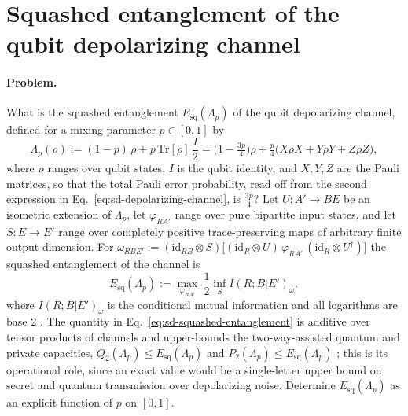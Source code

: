 \section{Squashed entanglement of the qubit depolarizing channel}
\label{sec:op_291a943fdec5bd1d}

\paragraph{Problem.}
What is the squashed entanglement $E_{\mathrm{sq}}(\Lambda_p)$ of the qubit
depolarizing channel, defined for a mixing parameter $p\in[0,1]$ by
\begin{equation}
  \Lambda_p(\rho):=(1-p)\,\rho+p\,\mathrm{Tr}[\rho]\,\frac{I}{2}
  =\bigl(1-\tfrac{3p}{4}\bigr)\rho
  +\tfrac{p}{4}\bigl(X\rho X+Y\rho Y+Z\rho Z\bigr),
  \label{eq:sd-depolarizing-channel}
\end{equation}
where $\rho$ ranges over qubit states, $I$ is the qubit identity, and
$X,Y,Z$ are the Pauli matrices, so that the total Pauli error probability,
read off from the second expression in Eq.~\eqref{eq:sd-depolarizing-channel},
is $\tfrac{3p}{4}$?  Let $U:A'\to BE$ be an isometric extension of
$\Lambda_p$, let $\varphi_{RA'}$ range over pure bipartite input states, and
let $S:E\to E'$ range over completely positive trace-preserving maps of
arbitrary finite output dimension.  For
$\omega_{RBE'}:=(\mathrm{id}_{RB}\otimes S)\bigl[(\mathrm{id}_R\otimes
U)\,\varphi_{RA'}\,(\mathrm{id}_R\otimes U^\dagger)\bigr]$ the squashed
entanglement of the channel is
\begin{equation}
  E_{\mathrm{sq}}(\Lambda_p)
  :=\max_{\varphi_{RA'}}\ \frac{1}{2}\inf_{S}I(R;B|E')_\omega,
  \label{eq:sd-squashed-entanglement}
\end{equation}
where $I(R;B|E')_\omega$ is the conditional mutual information and all
logarithms are base 2 .  The
quantity in Eq.~\eqref{eq:sd-squashed-entanglement} is additive over tensor
products of channels and upper-bounds the two-way-assisted quantum and
private capacities, $Q_2(\Lambda_p)\le E_{\mathrm{sq}}(\Lambda_p)$ and
$P_2(\Lambda_p)\le E_{\mathrm{sq}}(\Lambda_p)$
; this is its operational role,
since an exact value would be a single-letter upper bound on secret and
quantum transmission over depolarizing noise.  Determine
$E_{\mathrm{sq}}(\Lambda_p)$ as an explicit function of $p$ on $[0,1]$.

